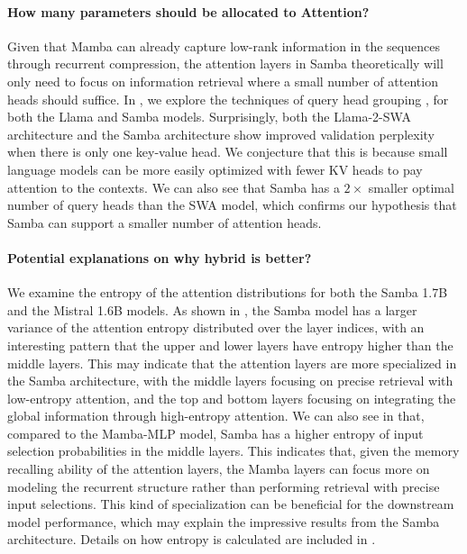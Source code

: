\documentclass{article}
\begin{document}
\paragraph{How many parameters should be allocated to Attention?} 
Given that Mamba can already capture low-rank information in the sequences through recurrent compression, the attention layers in Samba theoretically will only need to focus on information retrieval where a small number of attention heads should suffice. In , we explore the techniques of query head grouping \citep{ainslie2023gqa,shazeer2019fast}, for both the Llama and Samba models. Surprisingly, both the Llama-2-SWA architecture and the Samba architecture show improved validation perplexity when there is only one key-value head. We conjecture that this is because small language models can be more easily optimized with fewer KV heads to pay attention to the contexts. We can also see that Samba has a $2 \times$ smaller optimal number of query heads than the SWA model, which confirms our hypothesis that Samba can support a smaller number of attention heads.







\paragraph{Potential explanations on why hybrid is better?}


We examine the entropy of the attention distributions for both the Samba 1.7B and the Mistral 1.6B models. As shown in , the Samba model has a larger variance of the attention entropy distributed over the layer indices, with an interesting pattern that the upper and lower layers have entropy higher than the middle layers. This may indicate that the attention layers are more specialized in the Samba architecture, with the middle layers focusing on precise retrieval with low-entropy attention, and the top and bottom layers focusing on integrating the global information through high-entropy attention. We can also see in  that, compared to the Mamba-MLP model, Samba has a higher entropy of input selection probabilities in the middle layers. This indicates that, given the memory recalling ability of the attention layers, the Mamba layers can focus more on modeling the recurrent structure rather than performing retrieval with precise input selections. This kind of specialization can be beneficial for the downstream model performance, which may explain the impressive results from the Samba architecture. Details on how entropy is calculated are included in .
\end{document}
